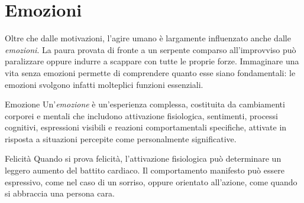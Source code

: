 \documentclass[a4paper]{article}
\begin{document}
\section{Emozioni}
Oltre che dalle motivazioni, l'agire umano è largamente influenzato anche dalle \emph{emozioni}. La paura provata di fronte a un serpente comparso all'improvviso può paralizzare oppure indurre a scappare con tutte le proprie forze.
Immaginare una vita senza emozioni permette di comprendere quanto esse siano fondamentali: le emozioni svolgono infatti molteplici funzioni essenziali.
\begin{snippetdefinition}{Emozione}
    Un'\emph{emozione} è un'esperienza complessa, costituita da cambiamenti corporei e mentali che includono attivazione fisiologica, sentimenti, processi cognitivi, espressioni visibili e reazioni comportamentali specifiche, attivate in risposta a situazioni percepite come personalmente significative.
\end{snippetdefinition}
\begin{snippetexample}{Felicità}
    Quando si prova felicità, l'attivazione fisiologica può determinare un leggero aumento del battito cardiaco. Il comportamento manifesto può essere espressivo, come nel caso di un sorriso, oppure orientato all'azione, come quando si abbraccia una persona cara.
\end{snippetexample}
\end{document}
